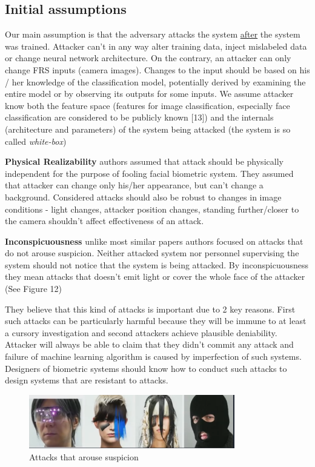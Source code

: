 \subsection{Initial assumptions}

Our main assumption is that the adversary attacks the system \underline{after} the system was trained. Attacker can't in any way alter training data, inject mislabeled data or change neural network architecture. On the contrary, an attacker can only change FRS inputs (camera images). Changes to the input should be based on his / her knowledge of the classification model, potentially derived by examining the entire model or by observing its outputs for some inputs. We assume attacker know both the feature space (features for image classification, especially face classification are considered to be publicly known [13]) and the internals (architecture and parameters) of the system being attacked (the system is so called \textit{white-box})
\newline

\textbf{Physical Realizability} authors assumed that attack should be physically independent for the purpose of fooling facial biometric system. They assumed that attacker can change only his/her appearance, but can't change a background. Considered attacks should also be robust to changes in image conditions - light changes, attacker position changes, standing further/closer to the camera shouldn't affect effectiveness of an attack. 
\newline

\textbf{Inconspicuousness} unlike most similar papers authors focused on attacks that do not arouse suspicion. Neither attacked system nor personnel supervising the system should not notice that the system is being attacked. By inconspicuousness they mean attacks that doesn't emit light or cover the whole face of the attacker (See Figure 12)

They believe that this kind of attacks is important due to 2 key reasons. First such attacks can be particularly harmful because they will be immune to at least a cursory investigation and second attackers achieve plausible deniability. Attacker will always be able to claim that they didn't commit any attack and failure of machine learning algorithm is caused by imperfection of such systems. Designers of biometric systems should know how to conduct such attacks to design systems that are resistant to attacks.  

\begin{figure}[ht]
\centering
\includegraphics[width=0.8\textwidth]{Images/attacks.png}
\caption[]{Attacks that arouse suspicion\footnotemark[5]}
\end{figure}


